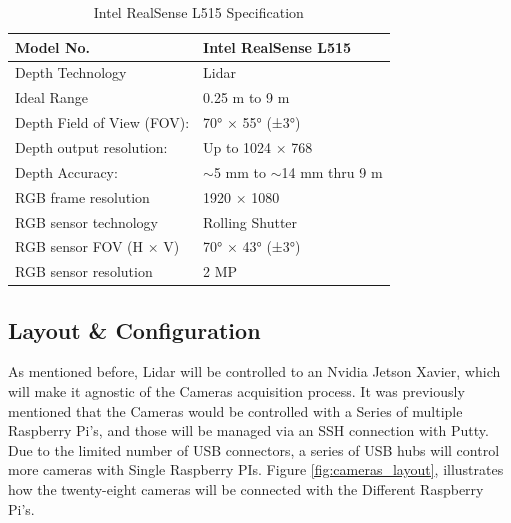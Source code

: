 \documentclass[12pt]{report}
\begin{document}
\begin{table}[H]
    \centering
    \begin{tabular}{|l|l|}
    \hline
    Model No.                  & Intel RealSense L515               \\ \hline
    Depth Technology           & Lidar                              \\ \hline
    Ideal Range                & 0.25 m to 9 m                      \\ \hline
    Depth Field of View (FOV): & 70° × 55° (±3°)                    \\ \hline
    Depth output resolution:   & Up to 1024 × 768                   \\ \hline
    Depth Accuracy:            & $\sim$5 mm to $\sim$14 mm thru 9 m \\ \hline
    RGB frame resolution       & 1920 × 1080                        \\ \hline
    RGB sensor technology      & Rolling Shutter                    \\ \hline
    RGB sensor FOV (H × V)     & 70° × 43° (±3°)                    \\ \hline
    RGB sensor resolution      & 2 MP                               \\ \hline
    \end{tabular}
    \caption{Intel RealSense L515 Specification}
    \label{tab:lidar_specs}
\end{table}







\subsection{Layout \& Configuration}
As mentioned before, Lidar will be controlled to an Nvidia Jetson Xavier, which will make it agnostic of the Cameras acquisition process. 
It was previously mentioned that the Cameras would be controlled with a Series of multiple Raspberry Pi's, and those will be managed via an SSH connection with Putty. 
Due to the limited number of USB connectors, a series of USB hubs will control more cameras with Single Raspberry PIs.
Figure \ref{fig:cameras_layout}, illustrates how the twenty-eight cameras will be connected with the Different Raspberry Pi's.
\end{document}
